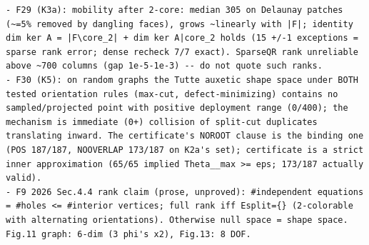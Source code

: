 \documentclass[10pt,a4paper]{article}
\begin{document}
\begin{lstlisting}
- F29 (K3a): mobility after 2-core: median 305 on Delaunay patches (~=5% removed by dangling faces), grows ~linearly with |F|; identity dim ker A = |F\core_2| + dim ker A|core_2 holds (15 +/-1 exceptions = sparse rank error; dense recheck 7/7 exact). SparseQR rank unreliable above ~700 columns (gap 1e-5-1e-3) -- do not quote such ranks.
- F30 (K5): on random graphs the Tutte auxetic shape space under BOTH tested orientation rules (max-cut, defect-minimizing) contains no sampled/projected point with positive deployment range (0/400); the mechanism is immediate (0+) collision of split-cut duplicates translating inward. The certificate's NOROOT clause is the binding one (POS 187/187, NOOVERLAP 173/187 on K2a's set); certificate is a strict inner approximation (65/65 implied Theta__max >= eps; 173/187 actually valid).
- F9 2026 Sec.4.4 rank claim (prose, unproved): #independent equations = #holes <= #interior vertices; full rank iff Esplit={} (2-colorable with alternating orientations). Otherwise null space = shape space. Fig.11 graph: 6-dim (3 phi's x2), Fig.13: 8 DOF.
\end{lstlisting}
\end{document}
